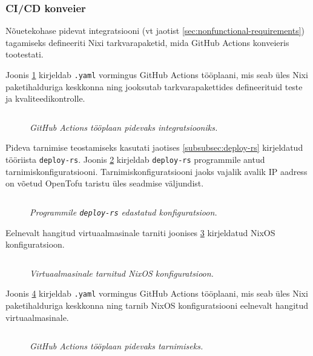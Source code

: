 \subsubsection{CI/CD konveier}

Nõuetekohase pidevat integratsiooni (vt jaotist \ref{sec:nonfunctional-requirements}) tagamiseks defineeriti Nixi tarkvarapaketid, mida GitHub Actions konveieris tootestati.

Joonis \ref{fig:ci-yaml} kirjeldab \texttt{.yaml} vormingus GitHub Actions tööplaani, mis seab üles Nixi paketihalduriga keskkonna ning jooksutab tarkvarapakettides defineerituid teste ja kvaliteedikontrolle.

\begin{figure}
\inputminted[breaklines]{yaml}{chapters/data/ci.yaml}
\caption{\emph{GitHub Actions tööplaan pidevaks integratsiooniks.}}\label{fig:ci-yaml}
\end{figure}

Pideva tarnimise teostamiseks kasutati jaotises \ref{subsubsec:deploy-rs} kirjeldatud tööriista \texttt{deploy-rs}. Joonis \ref{fig:deploy-rs-config} kirjeldab \texttt{deploy-rs} programmile antud tarnimiskonfiguratsiooni. Tarnimiskonfiguratsiooni jaoks vajalik avalik IP aadress on võetud OpenTofu taristu üles seadmise väljundist.

\begin{figure}
\inputminted[breaklines]{nix}{chapters/data/deploys.nix}
\caption{\emph{Programmile \texttt{deploy-rs} edastatud konfiguratsioon.}}\label{fig:deploy-rs-config}
\end{figure}

Eelnevalt hangitud virtuaalmasinale tarniti joonises \ref{fig:ec2-config} kirjeldatud NixOS konfiguratsioon. 

\begin{figure}
\inputminted[breaklines]{nix}{chapters/data/ec2-config.nix}
\caption{\emph{Virtuaalmasinale tarnitud NixOS konfiguratsioon.}}\label{fig:ec2-config}
\end{figure}

Joonis \ref{fig:cd-yaml} kirjeldab \texttt{.yaml} vormingus GitHub Actions tööplaani, mis seab üles Nixi paketihalduriga keskkonna ning tarnib NixOS konfiguratsiooni eelnevalt hangitud virtuaalmasinale.

\begin{figure}
\inputminted[breaklines]{yaml}{chapters/data/cd.yaml}
\caption{\emph{GitHub Actions tööplaan pidevaks tarnimiseks.}}\label{fig:cd-yaml}
\end{figure}

